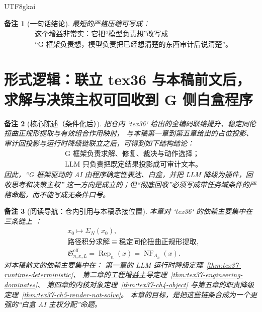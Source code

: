 \documentclass[12pt]{article}
\newtheorem{remark}{备注}[section]
\begin{document}
\begin{CJK*}{UTF8}{gkai}
\begin{remark}[一句话结论]
最短的严格压缩可写成：
\[
  \boxed{
    \begin{aligned}
      &\text{这个增益非常实：它把“模型负责想”改写成}\\
      &\text{“G 框架负责想，模型负责把已经想清楚的东西审计后说清楚”。}
    \end{aligned}
  }
\]
\end{remark}

\clearpage

\section{形式逻辑：联立 tex36 与本稿前文后，求解与决策主权可回收到 G 侧白盒程序}
\label{sec:tex37-ch6}

\begin{remark}[核心陈述（条件化后）]
把仓内 `tex36` 给出的全编码联络提升、稳定同伦扭曲正规形提取与有效组合作用映射，
与本稿第一章到第五章给出的占位投影、审计回投影与运行时降级链联立之后，可得到如下结构结论：
\[
  \boxed{
    \begin{aligned}
      &\text{G 框架负责求解、修复、裁决与动作选择；}\\
      &\text{LLM 只负责把既定结果投影成可审计文本。}
    \end{aligned}
  }
\]
因此，“G 框架驱动的 AI 由程序确定性表达、白盒，并把 LLM 降级为插件，回收思考和决策主权”
这一方向是成立的；但“彻底回收”必须写成带任务域条件的严格命题，而不能写成无条件口号。
\end{remark}

\begin{remark}[阅读导航：仓内引用与本稿承接位置]
本章对 `tex36` 的依赖主要集中在三条链上 \cite{RepoTex36HomotopyTwistBijection}：
\[
  \begin{aligned}
    &x_0\longmapsto \Sigma_N(x_0),\\
    &\text{路径积分求解}\equiv \text{稳定同伦扭曲正规形提取},\\
    &\mathfrak S_{n,x,L}^{\mathrm{eff}}=\operatorname{Rep}_n(x)=\operatorname{NF}_{A_n}(x).
  \end{aligned}
\]
对本稿前文的依赖主要集中在：
第一章的 LLM 运行时降级定理~\ref{thm:tex37-runtime-deterministic}、
第二章的工程增益主导定理~\ref{thm:tex37-engineering-dominates}、
第四章的内核对象定理~\ref{thm:tex37-ch4-object} 与第五章的职责降级定理~\ref{thm:tex37-ch5-render-not-solve}。
本章的目标，是把这些链条合成为一个更强的“白盒 AI 主权分配”命题。
\end{remark}


\end{CJK*}
\end{document}
